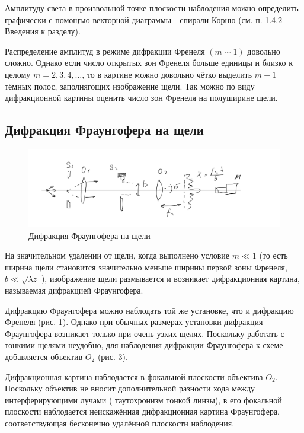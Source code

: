 \documentclass[a4paper, 12pt]{article}
\begin{document}
Амплитуду света в произвольной точке плоскости наблодения можно определить графически с помощъю векторной диаграммы - спирали Корню (см. п. 1.4.2 Введения к разделу).

Распределение амплитуд в режиме дифракции Френеля $(m \sim 1)$ довольно сложно. Однако если число открытых зон Френеля больше единицы и близко к целому $m=2,3,4, \ldots$, то в картине можно довольно чётко выделить $m-1$ тёмных полос, заполнягощих изображение щели. Так можно по виду дифракционной картины оценить число зон Френеля на полуширине щели.

\subsection*{Дифракция Фраунгофера на щели}

\begin{figure}[H]
    \centering
    \includegraphics[width=1\textwidth]{fraun1.jpg}
    \caption{Дифракция Фраунгофера на щели}
    \label{fig:ris2}
\end{figure}


На значительном удалении от щели, когда выполнено условие $m \ll 1$ (то есть ширина щели становится значительно меньше ширины первой зоны Френеля, $b \ll \sqrt{\lambda z}$ ), изображение щели размывается и возникает дифракционная картина, называемая дифракцией Фраунгофера.

Дифракцию Фраунгофера можно наблодать той же установке, что и дифракцию Френеля (рис. 1). Однако при обычных размерах установки дифракция Фраунгофера возникает только при очень узких щелях. Поскольку работать с тонкими щелями неудобно, для наблодения дифракции Фраунгофера к схеме добавляется объектив $O_2$ (рис. 3).

Дифракционная картина наблодается в фокальной плоскости объектива $O_2$. Поскольку объектив не вносит дополнительной разности хода между интерферирующими лучами ( таутохронизм тонкой линзы), в его фокальной плоскости наблодается неискажённая дифракционная картина Фраунгофера, соответствующая бесконечно удалённой плоскости наблодения.
\end{document}
